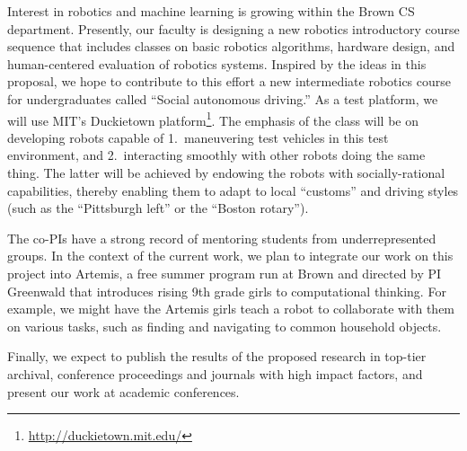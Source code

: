 Interest in robotics and machine learning is growing within the Brown
CS department.  Presently, our faculty is designing a new robotics
introductory course sequence that includes classes on basic robotics
algorithms, hardware design, and human-centered evaluation of robotics
systems.  Inspired by the ideas in this proposal, we hope to
contribute to this effort a new intermediate robotics course for
undergraduates called ``Social autonomous driving.''  As a test
platform, we will use MIT's Duckietown
platform\footnote{\url{http://duckietown.mit.edu/}}.  The emphasis of the class will be on developing robots
capable of 1.~maneuvering test vehicles in this test environment, and
2.~interacting smoothly with other robots doing the same thing.
%
%
The latter will be achieved by endowing the robots with
socially-rational capabilities, thereby enabling them to adapt to
local ``customs'' and driving styles (such as the ``Pittsburgh left''
or the ``Boston rotary'').



The co-PIs have a strong record of mentoring students from
underrepresented groups.  In the context of the current work, we plan
to integrate our work on this project into Artemis, a free summer
program run at Brown and directed by PI Greenwald that introduces
rising 9th grade girls to computational thinking.  For example, we
might have the Artemis girls teach a robot to collaborate with them on
various tasks, such as finding and navigating to common household
objects.


Finally, we expect to publish the results of the proposed research in
top-tier archival, conference proceedings and journals with high
impact factors, and present our work at academic conferences.


